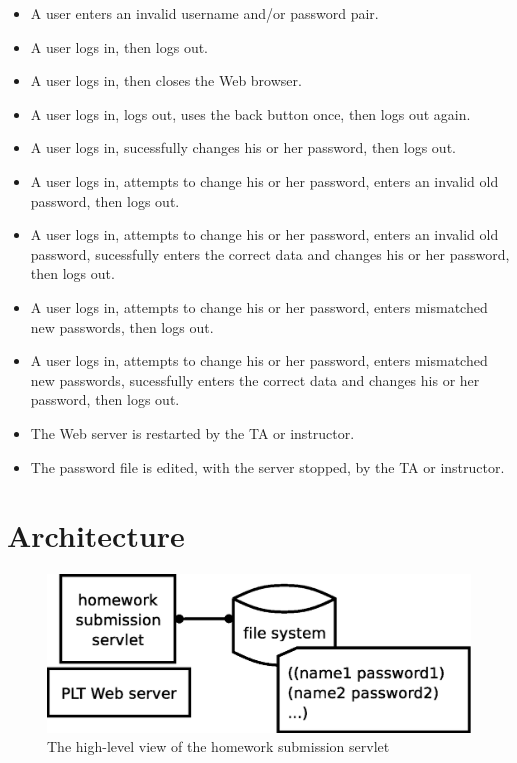 \documentclass{article}
\begin{document}
\begin{itemize}
\item{A user enters an invalid username and/or password pair.}
\item{A user logs in, then logs out.}
\item{A user logs in, then closes the Web browser.}
\item{A user logs in, logs out, uses the back button once, then logs out again.}
\item{A user logs in, sucessfully changes his or her password, then logs out.}
\item{A user logs in, attempts to change his or her password, enters an invalid
old password, then logs out.}
\item{A user logs in, attempts to change his or her password, enters an invalid
old password, sucessfully enters the correct data and changes his or her password,
then logs out.}
\item{A user logs in, attempts to change his or her password, enters mismatched
new passwords, then logs out.}
\item{A user logs in, attempts to change his or her password, enters mismatched
new passwords, sucessfully enters the correct data and changes his or her password,
then logs out.}
\item{The Web server is restarted by the TA or instructor.}
\item{The password file is edited, with the server stopped, by the TA or
instructor.}
\end{itemize}

\section{Architecture}\label{sec:arch}

\begin{figure}[ht]
\centering
\includegraphics[scale=.35]{architecture.eps}
\caption{The high-level view of the homework submission servlet}
\label{fig:architecture}
\end{figure}
\end{document}
